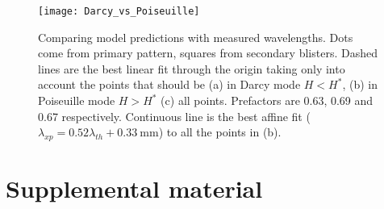 \documentclass[twocolumn,superscriptaddress,showpacs,preprintnumbers,amsmath,amssymb,prl]{revtex4-1}
\begin{document}
\begin{figure*}
	\texttt{[image: Darcy\_vs\_Poiseuille]}
	\caption{Comparing model predictions with measured wavelengths. Dots come from primary pattern, squares from secondary blisters. Dashed lines are the best linear fit through the origin taking only into account the points that should be (a) in Darcy mode $H<H^*$, (b) in Poiseuille mode $H>H^*$ (c) all points. Prefactors are 0.63, 0.69 and 0.67 respectively. Continuous line is the best affine fit ($\lambda_{xp}=0.52\lambda_{th}+\SI{0.33}{\milli\metre}$) to all the points in (b).}
	\label{fig:DarcyPoiseuille}
\end{figure*}

\clearpage
\newpage
\setcounter{figure}{0}

\section*{Supplemental material}
\end{document}
